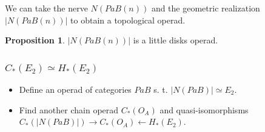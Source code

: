 \documentclass{beamer}
\theoremstyle{definition}
\newtheorem{prop}[teorema]{Proposition}
\begin{document}
\begin{frame}
 We can take the nerve $N(PaB(n))$ and the geometric realization $|N(PaB(n))|$ to obtain a topological operad.\pause
 \begin{prop}
 	$|N(PaB(n))|$ is a little disks operad.
 \end{prop}
\end{frame}

\begin{frame} 
\frametitle{$C_*(E_2)\simeq H_*(E_2)$}
	\begin{itemize}
	\item Define an operad of categories $PaB$ s. t. $|N(PaB)|\simeq E_2$. \checkmark
	\item Find another chain operad $C_*(O_A)$ and quasi-isomorphisms $C_*(|N(PaB)|)\to C_*(O_A)\leftarrow H_*(E_2)$. 
\end{itemize}%
\end{frame}
\end{document}
